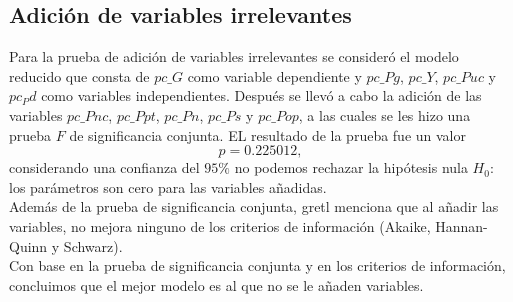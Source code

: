 \documentclass[12pt]{article}
\begin{document}
\subsection*{Adición de variables irrelevantes}
Para la prueba de adición de variables irrelevantes se consideró el modelo
reducido que consta de $pc\_G$ como variable dependiente y $pc\_Pg$, $pc\_Y$,
$pc\_Puc$ y $pc_Pd$ como variables independientes. Después se llevó a cabo
la adición de las variables $pc\_Pnc$, $pc\_Ppt$, $pc\_Pn$, $pc\_Ps$ y $pc\_Pop$,
a las cuales se les hizo una prueba $F$ de significancia conjunta. EL resultado
de la prueba fue un valor $$p=0.225012,$$ considerando una confianza del $95\%$
no podemos rechazar la hipótesis nula $H_0$: los parámetros son cero para las
variables añadidas.\\
Además de la prueba de significancia conjunta, gretl menciona que al añadir
las variables, no mejora ninguno de los criterios de información
(Akaike, Hannan-Quinn y Schwarz).\\
Con base en la prueba de significancia conjunta y en los criterios de información,
concluimos que el mejor modelo es al que no se le añaden variables.

\end{document}
